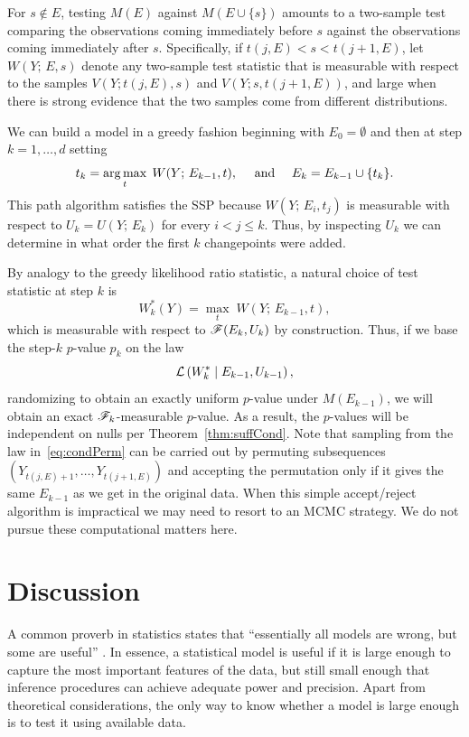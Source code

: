 \documentclass{article}
\begin{document}
For $s \notin E$, testing $M(E)$ against $M(E \cup \{s\})$ amounts to a two-sample test comparing the observations coming immediately before $s$ against the observations coming immediately after $s$. Specifically, if $t(j, E) < s < t(j+1, E)$, let $W(Y; \, E, s)$ denote any two-sample test statistic that is measurable with respect to the samples $V(Y; t(j, E), s)$ and $V(Y; s, t(j+1, E))$, and large when there is strong evidence that the two samples come from different distributions. 

We can build a model in a greedy fashion beginning with $E_0 = \emptyset$ and then at step $k=1,\ldots,d$ setting
\begin{equation*}
  t_k = \operatorname*{arg\,max}_t \; W(Y; \, E_{k-1}, t), 
  \quad \text{ and } \quad E_k = E_{k-1} \cup \{t_k\}.
\end{equation*}
This path algorithm satisfies the SSP because $W(Y; \, E_{i}, t_j)$ is measurable with respect to $U_k=U(Y; \, E_k)$ for every $i<j\leq k$. Thus, by inspecting $U_k$ we can determine in what order the first $k$ changepoints were added. 

By analogy to the greedy likelihood ratio statistic, a natural choice of test statistic at step $k$ is
\[
W_k^*(Y) = \max_t \; W(Y; \, E_{k-1}, t),
\]
which is measurable with respect to $\mathscr{F}(E_k, U_k)$ by construction. Thus, if we base the step-$k$ $p$-value $p_k$ on the law
\begin{equation}\label{eq:condPerm}
\mathcal{L}\left(W_k^* \mid E_{k-1}, U_{k-1}\right),
\end{equation}
randomizing to obtain an exactly uniform $p$-value under $M(E_{k-1})$, we will obtain an exact $\mathscr{F}_k$-measurable $p$-value. As a result, the $p$-values will be independent on nulls per Theorem~\ref{thm:suffCond}. Note that sampling from the law in~\eqref{eq:condPerm} can be carried out by permuting subsequences $(Y_{t(j,E)+1}, \ldots, Y_{t(j+1,E)})$ and accepting the permutation only if it gives the same $E_{k-1}$ as we get in the original data. When this simple accept/reject algorithm is impractical we may need to resort to an MCMC strategy. We do not pursue these computational matters here.

\section{Discussion}
\label{sec:discussion}

A common proverb in statistics states that ``essentially all models are wrong, but some are useful'' \citep{box1987empirical}. In essence, a statistical model is useful if it is large enough to capture the most important features of the data, but still small enough that inference procedures can achieve adequate power and precision. Apart from theoretical considerations, the only way to know whether a model is large enough is to test it using available data.
\end{document}

